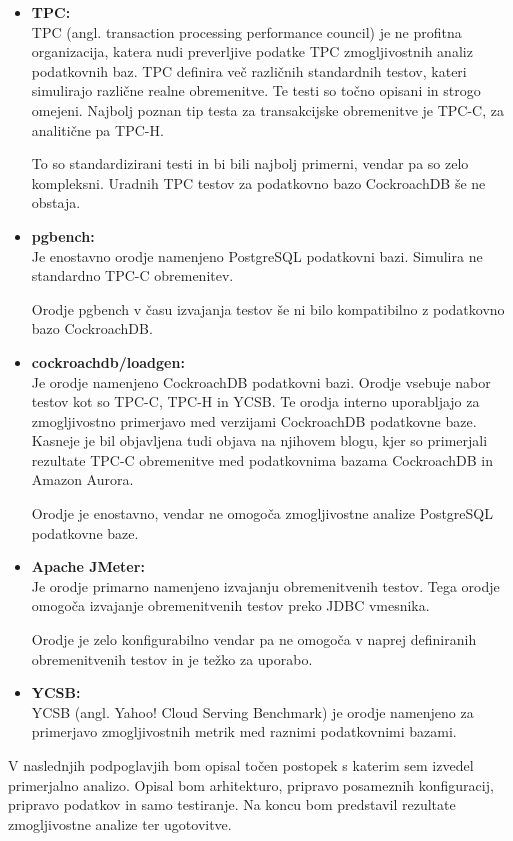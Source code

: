 \documentclass[a4paper, 12pt]{book}
\begin{document}
\begin{itemize}
    \item \textbf{TPC:}\\ TPC (angl. transaction processing performance council) \cite{TPC-home} je ne profitna organizacija, katera nudi preverljive podatke TPC zmogljivostnih analiz podatkovnih baz. TPC definira več različnih standardnih testov, kateri simulirajo različne realne obremenitve. Te testi so točno opisani in strogo omejeni. Najbolj poznan tip testa za transakcijske obremenitve je TPC-C, za analitične pa TPC-H.

    To so standardizirani testi in bi bili najbolj primerni, vendar pa so zelo kompleksni. Uradnih TPC testov za podatkovno bazo CockroachDB še ne obstaja.
    \item \textbf{pgbench:}\\ Je enostavno orodje namenjeno PostgreSQL podatkovni bazi. Simulira ne standardno TPC-C obremenitev.
    
    Orodje pgbench v času izvajanja testov še ni bilo kompatibilno z podatkovno bazo CockroachDB.
    \item \textbf{cockroachdb/loadgen:}\\ Je orodje namenjeno CockroachDB podatkovni bazi. Orodje vsebuje nabor testov kot so TPC-C, TPC-H in YCSB. Te orodja interno uporabljajo za zmogljivostno primerjavo med verzijami CockroachDB podatkovne baze. Kasneje je bil objavljena tudi objava na njihovem blogu, kjer so primerjali rezultate TPC-C obremenitve med podatkovnima bazama CockroachDB in Amazon Aurora.

    Orodje je enostavno, vendar ne omogoča zmogljivostne analize PostgreSQL podatkovne baze.
    \item \textbf{Apache JMeter:}\\ Je orodje primarno namenjeno izvajanju obremenitvenih testov. Tega orodje omogoča izvajanje obremenitvenih testov preko JDBC vmesnika.
    
    Orodje je zelo konfigurabilno vendar pa ne omogoča v naprej definiranih obremenitvenih testov in je težko za uporabo.
    \item \textbf{YCSB:}\\ YCSB (angl. Yahoo! Cloud Serving Benchmark) je orodje namenjeno za primerjavo zmogljivostnih metrik med raznimi podatkovnimi bazami.
\end{itemize}

V naslednjih podpoglavjih bom opisal točen postopek s katerim sem izvedel primerjalno analizo. Opisal bom arhitekturo, pripravo posameznih konfiguracij, pripravo podatkov in samo testiranje. Na koncu bom predstavil rezultate zmogljivostne analize ter ugotovitve.
\end{document}
